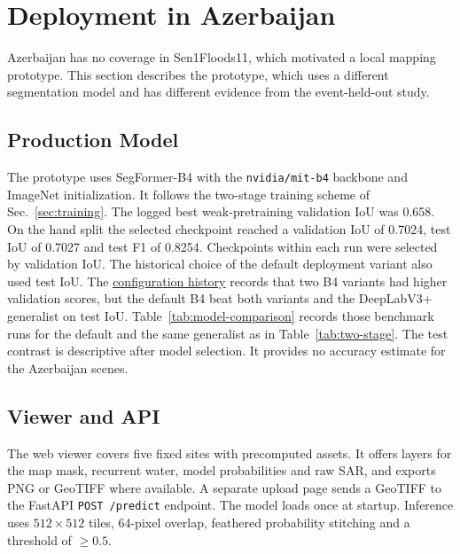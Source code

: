 \section{Deployment in Azerbaijan}
\label{sec:deployment}

Azerbaijan has no coverage in Sen1Floods11, which motivated a local
mapping prototype. This section describes the prototype, which uses a
different segmentation model and has different evidence from the
event-held-out study.

\subsection{Production Model}

The prototype uses SegFormer-B4 \cite{xie2021segformer} with the
\texttt{nvidia/mit-b4} backbone and ImageNet initialization. It follows
the two-stage training scheme of Sec.~\ref{sec:training}. The logged best
weak-pretraining validation IoU was 0.658. On the hand split the selected
checkpoint reached a validation IoU of 0.7024, test IoU of 0.7027 and
test F1 of 0.8254. Checkpoints within each run were selected by
validation IoU. The historical choice of the default deployment
variant also used test IoU. The
\href{https://github.com/AliAgabalayev/Flood-Damage-Detection/commit/5e727aaed7b5995c6edeec33e90c4e8a87718c8f}{configuration history}
records that two B4 variants had higher validation scores, but the
default B4 beat both variants and the DeepLabV3+ generalist on test
IoU. Table~\ref{tab:model-comparison} records those benchmark runs for
the default and the same generalist as in Table~\ref{tab:two-stage}.
The test contrast is descriptive after model selection. It provides
no accuracy estimate for the Azerbaijan scenes.

\begin{table}[!htbp]
\caption{Logged results for two seed-42 runs on the standard
Sen1Floods11 hand split. These are raw water segmentation scores.}
\label{tab:model-comparison}
\centering\small

\end{table}

\subsection{Viewer and API}
\label{sec:api}

The web viewer covers five fixed sites with precomputed assets. It
offers layers for the map mask, recurrent water, model probabilities
and raw SAR, and exports PNG or GeoTIFF where available. A separate
upload page sends a GeoTIFF to the FastAPI \texttt{POST /predict}
endpoint. The model loads once at startup. Inference uses $512\times512$
tiles, 64-pixel overlap, feathered probability stitching and a threshold
of $\geq0.5$.

